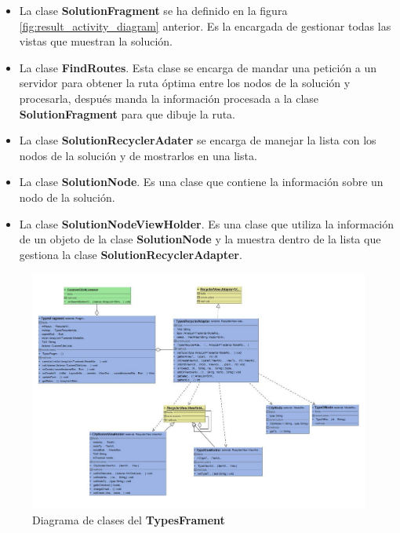 \begin{itemize}
	\item La clase \textbf{SolutionFragment} se ha definido en la figura \ref{fig:result_activity_diagram} anterior. Es la encargada de gestionar todas las vistas que muestran la solución.
	\item La clase \textbf{FindRoutes}. Esta clase se encarga de mandar una petición a un servidor para obtener la ruta óptima entre los nodos de la solución y procesarla, después manda la información procesada a la clase \textbf{SolutionFragment} para que dibuje la ruta.
	\item La clase \textbf{SolutionRecyclerAdater} se encarga de manejar la lista con los nodos de la solución y de mostrarlos en una lista.
	\item La clase \textbf{SolutionNode}. Es una clase que contiene la información sobre un nodo de la solución.
	\item La clase \textbf{SolutionNodeViewHolder}. Es una clase que utiliza la información de un objeto de la clase \textbf{SolutionNode}  y la muestra dentro de la lista que gestiona la clase \textbf{SolutionRecyclerAdapter}.
\end{itemize}
\newpage
\begin{figure}[H]
	\centering
	\includegraphics[scale=.8,angle=90]{imagenes/fragment_class_diagram.pdf}
	\caption{Diagrama de clases del \textbf{TypesFrament} }
	\label{fig:fragment_diagram}
\end{figure}
